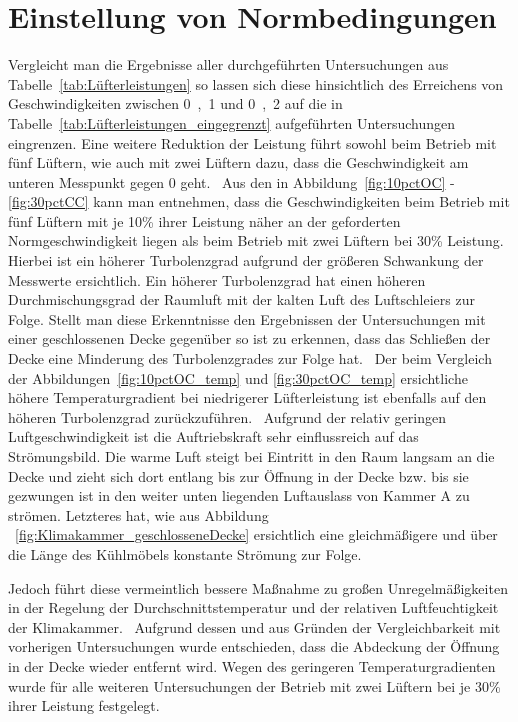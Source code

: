 \section{Einstellung von Normbedingungen}
\label{sec:Einstellung von Normbedingungen}

Vergleicht man die Ergebnisse aller durchgeführten Untersuchungen aus Tabelle~\ref{tab:Lüfterleistungen} so lassen sich diese hinsichtlich des Erreichens von Geschwindigkeiten zwischen \unit{0,1}{\meter\per\second} und \unit{0,2}{\meter\per\second} auf die in Tabelle~\ref{tab:Lüfterleistungen_eingegrenzt} aufgeführten Untersuchungen eingrenzen. Eine weitere Reduktion der Leistung führt sowohl beim Betrieb mit fünf Lüftern, wie auch mit zwei Lüftern dazu, dass die Geschwindigkeit am unteren Messpunkt gegen 0 geht. \
Aus den in Abbildung~\ref{fig:10pctOC} - \ref{fig:30pctCC} kann man entnehmen, dass die Geschwindigkeiten beim Betrieb mit fünf Lüftern mit je \unit{10}{\%} ihrer Leistung näher an der geforderten Normgeschwindigkeit liegen als beim Betrieb mit zwei Lüftern bei \unit{30}{\%} Leistung. Hierbei ist ein höherer Turbolenzgrad aufgrund der größeren Schwankung der Messwerte ersichtlich. Ein höherer Turbolenzgrad hat einen höheren Durchmischungsgrad der Raumluft mit der kalten Luft des Luftschleiers zur Folge. 
Stellt man diese Erkenntnisse den Ergebnissen der Untersuchungen mit einer geschlossenen Decke gegenüber so ist zu erkennen, dass das Schließen der Decke eine Minderung des Turbolenzgrades zur Folge hat. \
Der beim Vergleich der Abbildungen~\ref{fig:10pctOC_temp} und \ref{fig:30pctOC_temp} ersichtliche höhere Temperaturgradient bei niedrigerer Lüfterleistung ist ebenfalls auf den höheren Turbolenzgrad zurückzuführen. \
Aufgrund der relativ geringen Luftgeschwindigkeit ist die Auftriebskraft sehr einflussreich auf das Strömungsbild. Die warme Luft steigt bei Eintritt in den Raum langsam an die Decke und zieht sich dort entlang bis zur Öffnung in der Decke bzw. bis sie gezwungen ist in den weiter unten liegenden Luftauslass von Kammer A zu strömen.
Letzteres hat, wie aus Abbildung ~\ref{fig:Klimakammer_geschlosseneDecke} ersichtlich eine gleichmäßigere und über die Länge des Kühlmöbels konstante Strömung zur Folge.\

Jedoch führt diese vermeintlich bessere Maßnahme zu großen Unregelmäßigkeiten in der Regelung der Durchschnittstemperatur und der relativen Luftfeuchtigkeit der Klimakammer. \
Aufgrund dessen und aus Gründen der Vergleichbarkeit mit vorherigen Untersuchungen wurde entschieden, dass die Abdeckung der Öffnung in der Decke wieder entfernt wird. Wegen des geringeren Temperaturgradienten wurde für alle weiteren Untersuchungen der Betrieb mit zwei Lüftern bei je \unit{30}{\%} ihrer Leistung festgelegt.


